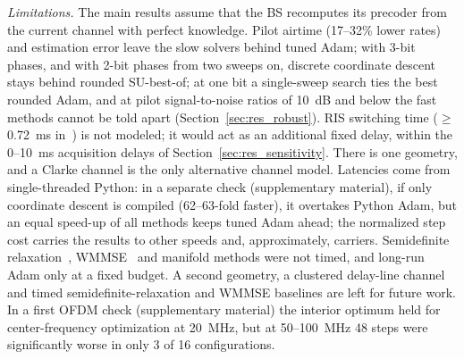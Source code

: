 \emph{Limitations.} The main results assume that the BS recomputes its precoder from the current channel with perfect knowledge. Pilot airtime (17--32\% lower rates) and estimation error leave the slow solvers behind tuned Adam; with 3-bit phases, and with 2-bit phases from two sweeps on, discrete coordinate descent stays behind rounded SU-best-of; at one bit a single-sweep search ties the best rounded Adam, and at pilot signal-to-noise ratios of 10~dB and below the fast methods cannot be told apart (Section~\ref{sec:res_robust}). RIS switching time ($\ge$0.72~ms in~\cite{Zhao2024OJCOMS}) is not modeled; it would act as an additional fixed delay, within the 0--10~ms acquisition delays of Section~\ref{sec:res_sensitivity}. There is one geometry, and a Clarke channel is the only alternative channel model. Latencies come from single-threaded Python: in a separate check (supplementary material), if only coordinate descent is compiled (62--63-fold faster), it overtakes Python Adam, but an equal speed-up of all methods keeps tuned Adam ahead; the normalized step cost carries the results to other speeds and, approximately, carriers. Semidefinite relaxation~\cite{Wu2019TWC}, WMMSE~\cite{Choi2024TCOM} and manifold methods were not timed, and long-run Adam only at a fixed budget. A second geometry, a clustered delay-line channel and timed semidefinite-relaxation and WMMSE baselines are left for future work. In a first OFDM check (supplementary material) the interior optimum held for center-frequency optimization at 20~MHz, but at 50--100~MHz 48 steps were significantly worse in only 3 of 16 configurations.

